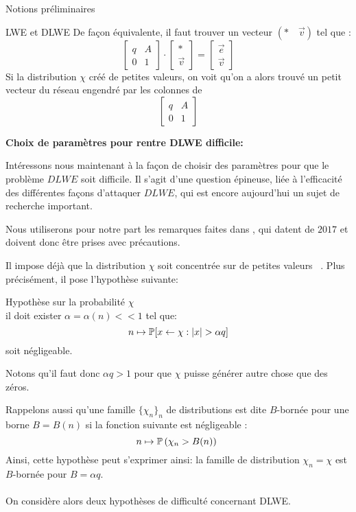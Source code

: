\begin{section}{Notions préliminaires}
\begin{subsection}{LWE et DLWE}
	De façon équivalente, il faut trouver un vecteur $(*\quad\vec{v})$ tel que :
	\[ \begin{bmatrix}q & A \\ 0 &1 \end{bmatrix}\cdot
	   \begin{bmatrix}* \\ \vec{v} \end{bmatrix} =
	   \begin{bmatrix} \vec{e} \\ \vec{v} \end{bmatrix} \]
	Si la distribution $\chi$ créé de petites valeurs, on voit qu'on a alors trouvé un \og petit \fg~ vecteur du réseau engendré par les colonnes de 
	\[ \begin{bmatrix}q & A \\ 0 &1 \end{bmatrix} \]

	\textbf{Choix de paramètres pour rentre DLWE difficile:}

	Intéressons nous maintenant à la façon de choisir des paramètres
	pour que le problème $DLWE$ soit difficile. Il s'agit d'une question épineuse, 
	liée à l'efficacité des différentes façons d'attaquer $DLWE$, qui est encore aujourd'hui
	un sujet de recherche important.

	Nous utiliserons pour notre part les remarques faites dans \cite{halevi}, qui datent de 
	$2017$ et doivent donc être prises avec précautions. 

	Il impose déjà que la distribution $\chi$ soit \og concentrée sur de
	petites valeurs \fg~. Plus précisément, il pose l'hypothèse suivante: 
	\begin{hyp}{Hypothèse sur la probabilité $\chi$}\\ \label{hyp:proba}
	il doit exister $\alpha = \alpha(n) <\!\!\!< 1$ tel que:
	\[ n \mapsto \mathbb{P} [x \leftarrow \chi : |x| > \alpha q]\] 
	soit négligeable.
	\end{hyp}
	Notons qu'il faut donc $\alpha q > 1$ pour que $\chi$ puisse générer autre chose 
	que des zéros. 

	Rappelons aussi qu'une famille $\{\chi_n\}_n$ de distributions est dite $B$-bornée pour une borne $B = B(n)$ si
	la fonction suivante est négligeable : 
	\[n \mapsto \PP\left(\chi_n > B(n)\right) \] 
	Ainsi, cette hypothèse peut s'exprimer ainsi: la famille de distribution $\chi_n = \chi$ est $B$-bornée pour $B
	= \alpha q$.


	\paragraph{}
	On considère alors deux hypothèses de difficulté 
	concernant DLWE. 


\end{subsection}
\end{section}

